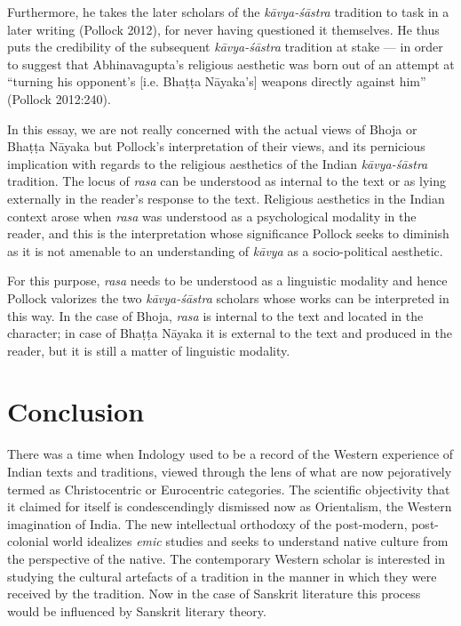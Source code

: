 Furthermore, he takes the later scholars of the \textsl{kāvya-śāstra} tradition to task in a later writing (Pollock 2012), for never having questioned it themselves. He thus puts the credibility of the subsequent \textsl{kāvya-śāstra} tradition at stake --- in order to suggest that Abhinavagupta's religious aesthetic was born out of an attempt at ``turning his opponent's [i.e. Bhaṭṭa Nāyaka's] weapons directly against him'' (Pollock 2012:240).

In this essay, we are not really concerned with the actual views of Bhoja or Bhaṭṭa Nāyaka but Pollock's interpretation of their  views, and its pernicious implication with regards to the religious aesthetics of the Indian \textsl{kāvya-śāstra} tradition. The locus of \textsl{rasa} can be understood as internal to the text or as lying externally in the reader's response to the text. Religious aesthetics in the Indian context arose when \textsl{rasa} was understood as a psychological modality in the reader, and this is the interpretation whose significance Pollock seeks to diminish as it is not amenable to an understanding of \textsl{kāvya} as a socio-political aesthetic. 

For this purpose, \textsl{rasa} needs to be understood as a linguistic modality and hence Pollock
 valorizes the two \textsl{kāvya-śāstra} scholars whose works can be interpreted in this way. In the case of Bhoja, \textsl{rasa} is internal to the text and located in the character; in case of Bhaṭṭa Nāyaka it is external to the text and produced in the reader, but it is still a matter of linguistic modality. 

\section*{Conclusion}

There was a time when Indology used to be a record of the Western experience of Indian texts and traditions, viewed through the lens of what are now pejoratively termed as Christocentric or Eurocentric categories. The scientific objectivity that it claimed for itself is condescendingly dismissed now as Orientalism, the Western imagination of India. The new intellectual orthodoxy of the post-modern, post-colonial world idealizes \textsl{emic} studies and seeks to understand native culture from the perspective of the native. The contemporary Western scholar is interested in studying the cultural artefacts of a tradition in the manner in which they were received by the tradition. Now in the case of Sanskrit literature this process would be influenced by Sanskrit literary theory. 

